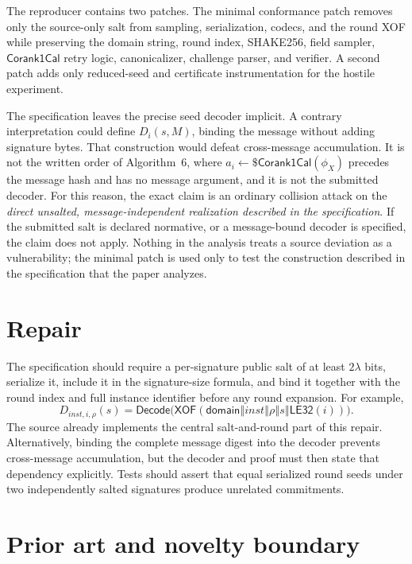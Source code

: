 \documentclass[11pt,a4paper]{article}
\newcommand{\sample}{\mathrel{\leftarrow\$}}
\newcommand{\Corank}{\mathsf{Corank1Cal}}
\begin{document}
The reproducer contains two patches.  The minimal conformance patch removes
only the source-only salt from sampling, serialization, codecs, and the round
XOF while preserving the domain string, round index, SHAKE256, field sampler,
$\Corank$ retry logic, canonicalizer, challenge parser, and verifier.  A second
patch adds only reduced-seed and certificate instrumentation for the hostile
experiment.

The specification leaves the precise seed decoder implicit.  A contrary interpretation
could define $D_i(s,M)$, binding the message without adding signature bytes.
That construction would defeat cross-message accumulation.  It is not the
written order of Algorithm~6, where $a_i\sample\Corank(\phi_X)$ precedes the
message hash and has no message argument, and it is not the submitted decoder.
For this reason, the exact claim is an ordinary collision attack on the
\emph{direct unsalted, message-independent realization described in the
specification}.  If the submitted
salt is declared normative, or a message-bound decoder is specified, the
claim does not apply.  Nothing in the analysis treats a source deviation as a
vulnerability; the minimal patch is used only to test the construction
described in the specification that the paper analyzes.

\section{Repair}

The specification should require a per-signature public salt of at least $2\lambda$ bits,
serialize it, include it in the signature-size formula, and bind it together
with the round index and full instance identifier before any round expansion.
For example,
\begin{equation}
 D_{\mathit{inst},i,\rho}(s)=
 \mathsf{Decode}\bigl(
   \mathsf{XOF}(\mathsf{domain}\mathbin\Vert\mathit{inst}
   \mathbin\Vert\rho\mathbin\Vert s\mathbin\Vert\mathsf{LE32}(i))
 \bigr).                                                \label{eq:repair}
\end{equation}
The source already implements the central salt-and-round part of this repair.
Alternatively, binding the complete message digest into the decoder prevents
cross-message accumulation, but the decoder and proof must then state that
dependency explicitly.  Tests should assert that equal serialized round seeds
under two independently salted signatures produce unrelated commitments.

\section{Prior art and novelty boundary}
\end{document}
